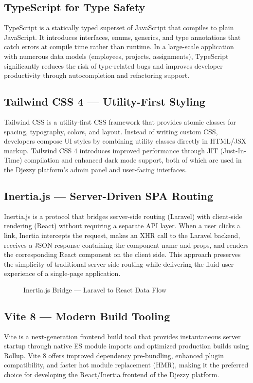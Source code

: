 \documentclass{bts-report}
\begin{document}
\subsection{TypeScript for Type Safety}
TypeScript is a statically typed superset of JavaScript that compiles to plain JavaScript. It introduces interfaces, enums, generics, and type annotations that catch errors at compile time rather than runtime. In a large-scale application with numerous data models (employees, projects, assignments), TypeScript significantly reduces the risk of type-related bugs and improves developer productivity through autocompletion and refactoring support.

\subsection{Tailwind CSS 4 --- Utility-First Styling}
Tailwind CSS is a utility-first CSS framework that provides atomic classes for spacing, typography, colors, and layout. Instead of writing custom CSS, developers compose UI styles by combining utility classes directly in HTML/JSX markup. Tailwind CSS 4 introduces improved performance through JIT (Just-In-Time) compilation and enhanced dark mode support, both of which are used in the Djezzy platform's admin panel and user-facing interfaces.

\subsection{Inertia.js --- Server-Driven SPA Routing}
Inertia.js is a protocol that bridges server-side routing (Laravel) with client-side rendering (React) without requiring a separate API layer. When a user clicks a link, Inertia intercepts the request, makes an XHR call to the Laravel backend, receives a JSON response containing the component name and props, and renders the corresponding React component on the client side. This approach preserves the simplicity of traditional server-side routing while delivering the fluid user experience of a single-page application.

\begin{figure}[htbp]
  \centering
  \resizebox{\textwidth}{!}{}
  \caption{Inertia.js Bridge --- Laravel to React Data Flow}
  \label{fig:inertia-bridge}
\end{figure}

\subsection{Vite 8 --- Modern Build Tooling}
Vite is a next-generation frontend build tool that provides instantaneous server startup through native ES module imports and optimized production builds using Rollup. Vite 8 offers improved dependency pre-bundling, enhanced plugin compatibility, and faster hot module replacement (HMR), making it the preferred choice for developing the React/Inertia frontend of the Djezzy platform.
\end{document}
